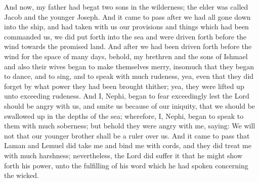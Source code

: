 \bverse \iffalse And now, my father had begat two sons in the wilderness; the elder was called Jacob and the younger Joseph. \fi
And now, my father had begat two sons in the wilderness; the elder was called Jacob and the younger Joseph.
\bverse \iffalse And it came to pass after we had all gone down into the ship, and had taken with us our provisions and things which had been commanded us, we did put forth into the sea and were driven forth before the wind towards the promised land. \fi
And it came to pass after we had all gone down into the ship, and had taken with us our provisions and things which had been commanded us, we did put forth into the sea and were driven forth before the wind towards the promised land.
\bverse \iffalse And after we had been driven forth before the wind for the space of many days, behold, my brethren and the sons of Ishmael and also their wives began to make themselves merry, insomuch that they began to dance, and to sing, and to speak with much rudeness, yea, even that they did forget by what power they had been brought thither; yea, they were lifted up unto exceeding rudeness. \fi
And after we had been driven forth before the wind for the space of many days, behold, my brethren and the sons of Ishmael and also their wives began to make themselves merry, insomuch that they began to dance, and to sing, and to speak with much rudeness, yea, even that they did forget by what power they had been brought thither; yea, they were lifted up unto exceeding rudeness.
\bverse \iffalse And I, Nephi, began to fear exceedingly lest the Lord should be angry with us, and smite us because of our iniquity, that we should be swallowed up in the depths of the sea; wherefore, I, Nephi, began to speak to them with much soberness; but behold they were angry with me, saying: We will not that our younger brother shall be a ruler over us. \fi
And I, Nephi, began to fear exceedingly lest the Lord should be angry with us, and smite us because of our iniquity, that we should be swallowed up in the depths of the sea; wherefore, I, Nephi, began to speak to them with much soberness; but behold they were angry with me, saying: We will not that our younger brother shall be a ruler over us.
\bverse \iffalse And it came to pass that Laman and Lemuel did take me and bind me with cords, and they did treat me with much harshness; nevertheless, the Lord did suffer it that he might show forth his power, unto the fulfilling of his word which he had spoken concerning the wicked. \fi
And it came to pass that Laman and Lemuel did take me and bind me with cords, and they did treat me with much harshness; nevertheless, the Lord did suffer it that he might show forth his power, unto the fulfilling of his word which he had spoken concerning the wicked.

